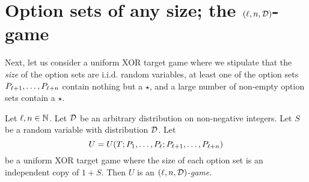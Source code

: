 









\section{Option sets of any size\texorpdfstring{; the $(\ell, n, \mathcal{D})$-game}{}}
    Next, let us consider a uniform XOR target game where we stipulate that 
    the \emph{size} of the option sets are i.i.d. random variables, 
    at least one of the option sets $P_{\ell+1}, \ldots, P_{\ell+n}$ contain nothing but a $\star$, 
    and a large number of non-empty option sets contain a $\star$. 

    \begin{definition}
        \label{def:ell-n-dist-game}
        Let $\ell, n\in \mathbb{N}$. 
        Let $\mathcal{D}$ be an arbitrary distribution on non-negative integers. 
        Let $S$ be a random variable with distribution $\mathcal{D}$.
        Let $$U = U(T; P_1, \ldots, P_\ell; P_{\ell+1}, \ldots, P_{\ell+n} )$$ be a uniform XOR target game where 
        the size of each option set is an independent copy of $1 + S$. 
        Then $U$ is an \emph{$(\ell, n, \mathcal{D})$-game}.
    \end{definition}

